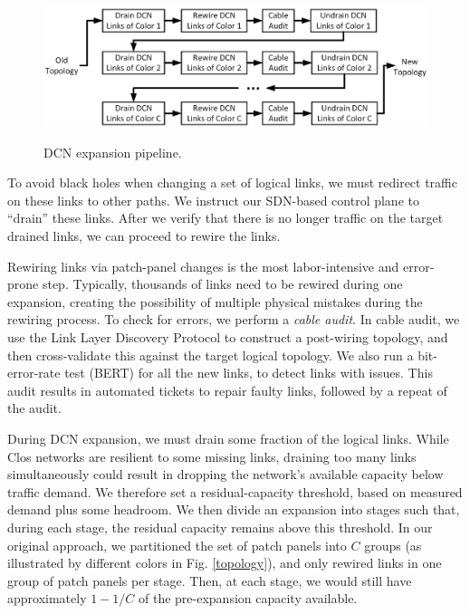 \documentclass[letterpaper,twocolumn,10pt]{article}
\begin{document}
\begin{figure}
 \centering
 \includegraphics[scale=0.39]{pipeline}\\
\vspace{-1ex}
 \caption{DCN expansion pipeline.}\label{expansionpipeline}
\end{figure}

To avoid black holes when changing a set of logical links, we must redirect traffic on these links to other paths.  We instruct our SDN-based control plane to ``drain'' these links. After we verify that there is no longer traffic on the target drained links, we can proceed to rewire the links.

Rewiring links via patch-panel changes is the most labor-intensive and error-prone step. Typically, thousands of links need to be rewired during one expansion, creating the possibility of multiple physical mistakes during the rewiring process. To check for errors, we perform a \emph{cable audit}. In cable audit, we use the Link Layer Discovery Protocol to construct a post-wiring topology, and then cross-validate this against the target logical topology. We also run a bit-error-rate test (BERT) for all the new links, to detect links with issues.  This audit results in automated tickets to repair faulty links, followed by a repeat of the audit. 

During DCN expansion, we must drain some fraction of the logical links.  While Clos networks are resilient to some missing links, draining too many links simultaneously could result in dropping the network's available capacity below traffic demand.  We therefore set a residual-capacity threshold, based on measured demand plus some headroom.  We then divide an expansion into stages such that, during each stage, the residual capacity remains above this threshold.  In our original approach, we partitioned the set of patch panels into $C$ groups (as illustrated by different colors in Fig. \ref{topology}), and only rewired links in one group of patch panels per stage. Then, at each stage, we would still have approximately $1-1/C$ of the pre-expansion capacity available.
\end{document}
